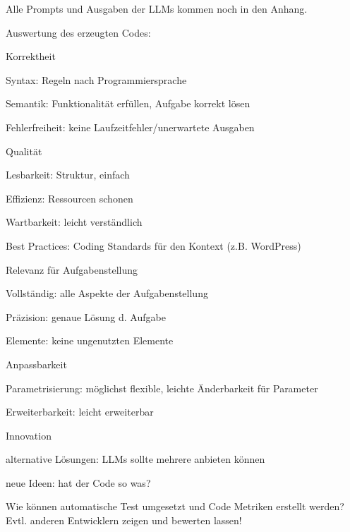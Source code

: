 \begin{tcolorbox}[
	enhanced,
	breakable,
	colback=red!5!white,
	colframe=red!75!black!50,
	title= Mein roter Faden
	]
	Alle Prompts und Ausgaben der LLMs kommen noch in den Anhang.\vspace{0.2cm}
	
	Auswertung des erzeugten Codes:
	\begin{myitemize}
		\item Korrektheit
		\begin{myitemize}
			\item Syntax: Regeln nach Programmiersprache
			\item Semantik: Funktionalität erfüllen, Aufgabe korrekt lösen
			\item Fehlerfreiheit: keine Laufzeitfehler/unerwartete Ausgaben
		\end{myitemize}
		\item Qualität
		\begin{myitemize}
			\item Lesbarkeit: Struktur, einfach
			\item Effizienz: Ressourcen schonen
			\item Wartbarkeit: leicht verständlich
			\item Best Practices: Coding Standards für den Kontext (z.B. WordPress)
		\end{myitemize}
		\item Relevanz für Aufgabenstellung
		\begin{myitemize}
			\item Vollständig: alle Aspekte der Aufgabenstellung
			\item Präzision: genaue Lösung d. Aufgabe
			\item Elemente: keine ungenutzten Elemente
		\end{myitemize}
		\item Anpassbarkeit
		\begin{myitemize}
			\item Parametrisierung: möglichst flexible, leichte Änderbarkeit für Parameter
			\item Erweiterbarkeit: leicht erweiterbar
		\end{myitemize}
		\item Innovation
		\begin{myitemize}
			\item alternative Lösungen: LLMs sollte mehrere anbieten können
			\item neue Ideen: hat der Code so was?
		\end{myitemize}
	\end{myitemize}

	Wie können automatische Test umgesetzt und Code Metriken erstellt werden? Evtl. anderen Entwicklern zeigen und bewerten lassen!
\end{tcolorbox}


